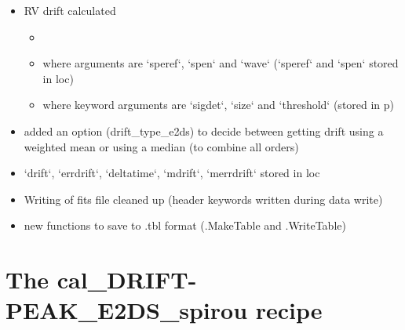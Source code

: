 \begin{itemize}
\item RV drift calculated
	\begin{itemize}
	\item {}
	\item where arguments are `speref`, `spen` and `wave` (`speref` and `spen` stored in loc)
	\item where keyword arguments are `sigdet`, `size` and `threshold` (stored in p)
	\end{itemize}

\item added an option (drift\_type\_e2ds) to decide between getting drift using a weighted mean or using a median (to combine all orders)

\item `drift`, `errdrift`, `deltatime`, `mdrift`, `merrdrift` stored in loc

\item Writing of fits file cleaned up (header keywords written during data write)

\item new functions to save to .tbl format (\spirouImage.MakeTable and \spirouImage.WriteTable)

\end{itemize}


\section{The cal\_DRIFT-PEAK\_E2DS\_spirou recipe}
\label{ch:changelog:At4:cal_DRIFT-PEAK_E2DS_spirou}

